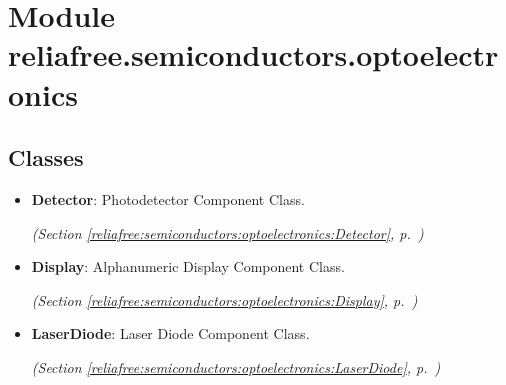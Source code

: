 %
%
%


\section{Module reliafree.semiconductors.optoelectronics}

    \label{reliafree:semiconductors:optoelectronics}


\subsection{Classes}

\begin{itemize}  \setlength{\parskip}{0ex}
  \item \textbf{Detector}: Photodetector Component Class.



  \textit{(Section \ref{reliafree:semiconductors:optoelectronics:Detector}, p.~\pageref{reliafree:semiconductors:optoelectronics:Detector})}

  \item \textbf{Display}: Alphanumeric Display Component Class.



  \textit{(Section \ref{reliafree:semiconductors:optoelectronics:Display}, p.~\pageref{reliafree:semiconductors:optoelectronics:Display})}

  \item \textbf{LaserDiode}: Laser Diode Component Class.



  \textit{(Section \ref{reliafree:semiconductors:optoelectronics:LaserDiode}, p.~\pageref{reliafree:semiconductors:optoelectronics:LaserDiode})}

\end{itemize}

